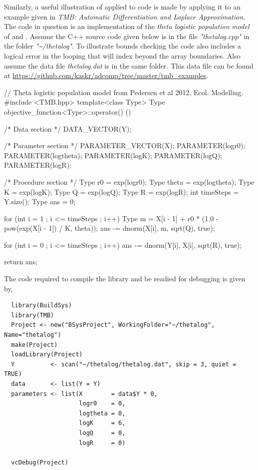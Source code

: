 Similarly, a useful illustration of  applied to  code is made by applying it to an example given 
in \emph{TMB: Automatic Differentiation and Laplace Approximation}\citep{TMBlaplace}. The code in question is 
an implementation of the \emph{theta logistic population model} of \citep{WangG} and \citep{PedersenEtAl}.
Assume the C++ source code given below is in the file \emph{"thetalog.cpp"} in the folder \emph{"\textasciitilde/thetalog"}. 
To illustrate bounds checking the code also includes a logical error in the looping that will index beyond the array boundaries.
Also assume the data file \emph{thetalog.dat} is in the same folder. This data file can be found at 
\href{https://github.com/kaskr/adcomp/tree/master/tmb_examples}{https://github.com/kaskr/adcomp/tree/master/tmb\_examples}.

\begin{Schunk}
  \begin{Sinput}
    // Theta logistic population model from Pedersen et al 2012, Ecol. Modelling.
    #include <TMB.hpp>
    template<class Type>
    Type objective_function<Type>::operator() ()
    {
      /* Data section */
      DATA_VECTOR(Y);

      /* Parameter section */
      PARAMETER_VECTOR(X);
      PARAMETER(logr0);
      PARAMETER(logtheta);
      PARAMETER(logK);
      PARAMETER(logQ);
      PARAMETER(logR);

      /* Procedure section */
      Type r0       = exp(logr0);
      Type theta    = exp(logtheta);
      Type K        = exp(logK);
      Type Q        = exp(logQ);
      Type R        = exp(logR);
      int timeSteps = Y.size();
      Type ans      = 0;

      for (int i = 1 ; i <= timeSteps ; i++)
      {
        Type m = X[i - 1] + r0 * (1.0 - pow(exp(X[i - 1]) / K, theta));
        ans -= dnorm(X[i], m, sqrt(Q), true);
      }

      for (int i = 0 ; i <= timeSteps ; i++)
      {
        ans -= dnorm(Y[i], X[i], sqrt(R), true);
      }

      return ans;
    }
  \end{Sinput}
\end{Schunk}

The  code required to compile the library and be readied for debugging is given by,

\begin{Schunk}
  \begin{verbatim}
  library(BuildSys)
  library(TMB)
  Project <- new("BSysProject", WorkingFolder="~/thetalog", Name="thetalog")
  make(Project)
  loadLibrary(Project)
  Y          <- scan("~/thetalog/thetalog.dat", skip = 3, quiet = TRUE)
  data       <- list(Y = Y)
  parameters <- list(X        = data$Y * 0,
                     logr0    = 0,
                     logtheta = 0,
                     logK     = 6,
                     logQ     = 0,
                     logR     = 0)
    
  vcDebug(Project)
  \end{verbatim}
\end{Schunk}

